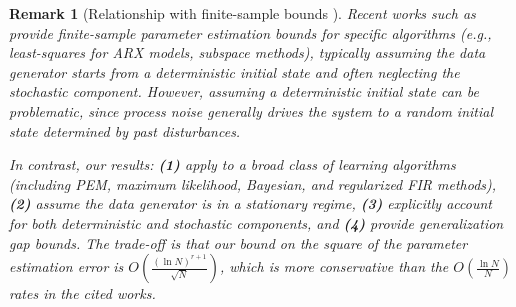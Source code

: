 \documentclass{article}
\newtheorem{remark}[theorem]{Remark}
\begin{document}
\begin{remark}[Relationship with finite-sample bounds \cite{oymak2021revisiting,lale2020logarithmic,Simchowitz_Foster_2020,Ziemann1,Ziemann2}]
  \label{rem:finite-sample}
Recent works such as \cite{oymak2021revisiting,lale2020logarithmic,Simchowitz_Foster_2020,Ziemann1,Ziemann2} provide finite-sample parameter estimation bounds for specific algorithms (e.g., least-squares for ARX models, subspace methods), typically assuming the data generator starts from a deterministic initial state and often neglecting the stochastic component. However, assuming a deterministic initial state can be problematic, since process noise generally drives the system to a random initial state determined by past disturbances.

In contrast, our results: \textbf{(1)} apply to a broad class of learning algorithms (including PEM, maximum likelihood, Bayesian, and regularized FIR methods), \textbf{(2)} assume the data generator is in a stationary regime, \textbf{(3)} explicitly account for both deterministic and stochastic components, and \textbf{(4)} provide generalization gap bounds. The trade-off is that our bound on the square of the parameter estimation error is $O\left(\frac{(\ln N)^{r+1}}{\sqrt{N}}\right)$, which is more conservative than the $O\left(\frac{\ln N}{N}\right)$ rates in the cited works.
\end{remark}
\end{document}
